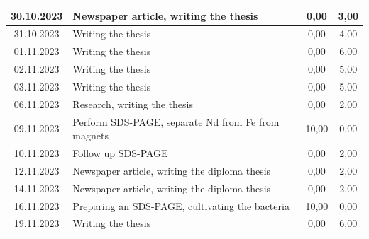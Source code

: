 \begin{longtable}{|c|p{7cm}|c|c|}
    30.10.2023    & Newspaper article, writing the thesis                                                                           & 0,00                 & 3,00              \\ \hline
    31.10.2023    & Writing the thesis                                                                                              & 0,00                 & 4,00              \\ \hline
    01.11.2023    & Writing the thesis                                                                                              & 0,00                 & 6,00              \\ \hline
    02.11.2023    & Writing the thesis                                                                                              & 0,00                 & 5,00              \\ \hline
    03.11.2023    & Writing the thesis                                                                                              & 0,00                 & 5,00              \\ \hline
    06.11.2023    & Research, writing the thesis                                                                                    & 0,00                 & 2,00              \\ \hline
    09.11.2023    & Perform SDS-PAGE, separate Nd from Fe from magnets                                                              & 10,00                & 0,00              \\ \hline
    10.11.2023    & Follow up SDS-PAGE                                                                                              & 0,00                 & 2,00              \\ \hline
    12.11.2023    & Newspaper article, writing the diploma thesis                                                                   & 0,00                 & 2,00              \\ \hline
    14.11.2023    & Newspaper article, writing the diploma thesis                                                                   & 0,00                 & 2,00              \\ \hline
    16.11.2023    & Preparing an SDS-PAGE, cultivating the bacteria                                                                 & 10,00                & 0,00              \\ \hline
    19.11.2023    & Writing the thesis                                                                                              & 0,00                 & 6,00              \\ \hline

\end{longtable}
